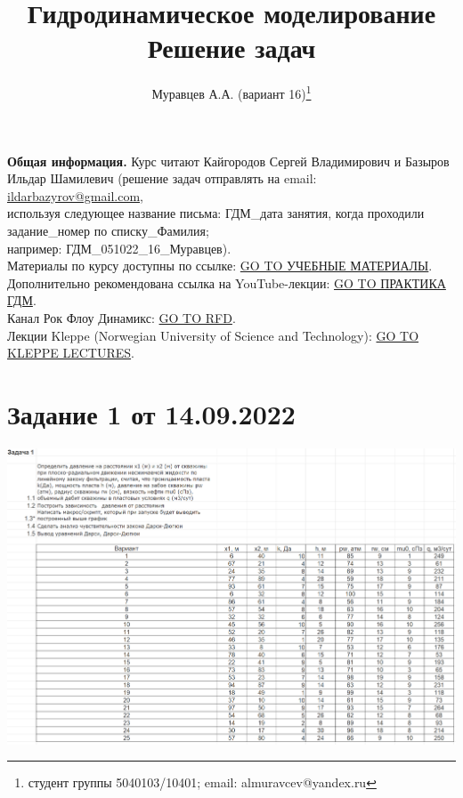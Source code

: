 \documentclass[a4paper,12pt]{article}
\begin{document}
\textbf{Общая информация.} Курс читают Кайгородов Сергей Владимирович и Базыров Ильдар Шамилевич (решение задач отправлять на email: \href{mailto:ildarbazyrov@gmail.com}{ildarbazyrov@gmail.com},\\
используя следующее название письма: ГДМ\_дата занятия, когда проходили задание\_номер по списку\_Фамилия;\\
например: ГДМ\_051022\_16\_Муравцев).\\
Материалы по курсу доступны по ссылке: \href{https://csspbstu-my.sharepoint.com/:f:/g/personal/muravtsev_aa_edu_spbstu_ru/Epiacj6WFMBHqIF6E3YQgCMB7yi5NAA1ycqFLqrTZMhJ4w?e=i2agP0}{GO TO УЧЕБНЫЕ МАТЕРИАЛЫ}.\\
Дополнительно рекомендована ссылка на YouTube-лекции: \href{https://youtube.com/playlist?list=PLDW64ZxU0_y5QCvZ048VptkQPoKJZPdEc}{GO TO ПРАКТИКА ГДМ}.\\
Канал Рок Флоу Динамикс: \href{https://www.youtube.com/c/RockFlowDynamics/playlists}{GO TO RFD}.\\
Лекции Kleppe (Norwegian University of Science and Technology): \href{http://www.ipt.ntnu.no/~kleppe/TPG4160/}{GO TO KLEPPE LECTURES}.

\tableofcontents
\title{Гидродинамическое моделирование\\Решение задач}
\author{Муравцев А.А. (вариант 16)\thanks{студент группы 5040103/10401; email: almuravcev@yandex.ru}}
\maketitle


\section{Задание 1 от 14.09.2022}
\includegraphics[width=\textwidth]{task1}
\end{document}
